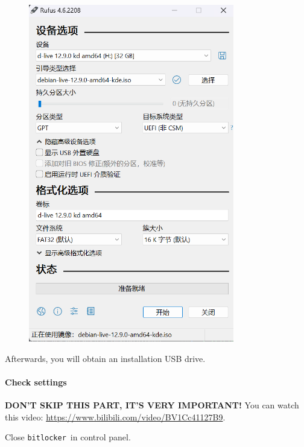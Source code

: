 \documentclass[12pt]{ctexart}
\newenvironment{mdquote}
{%
  \par\noindent
  \begin{list}{}{%
      \setlength{\leftmargin}{1em}%
      \setlength{\rightmargin}{0pt}%
      \setlength{\itemindent}{0pt}%
      \setlength{\listparindent}{\parindent}%
      \setlength{\topsep}{0.5\baselineskip}%
  }
  \item[\textbf{>}\ ]\itshape
}
{\end{list}\par}
\begin{document}
\begin{figure}[H]
    \centering
    \includegraphics[width=0.8\textwidth,keepaspectratio]{assets/Linux/3.1 Seek common ground while reserving differences/5.png}
\end{figure}

Afterwards, you will obtain an installation USB drive.

\paragraph{\textbf{Check settings}}\par
\vspace{1em}
\begin{mdquote}
\textbf{DON'T SKIP THIS PART, IT'S VERY
IMPORTANT!} You can watch this video:
\url{https://www.bilibili.com/video/BV1Cc41127B9}.
\end{mdquote}

Close \texttt{bitlocker}\ in control panel.
\end{document}
